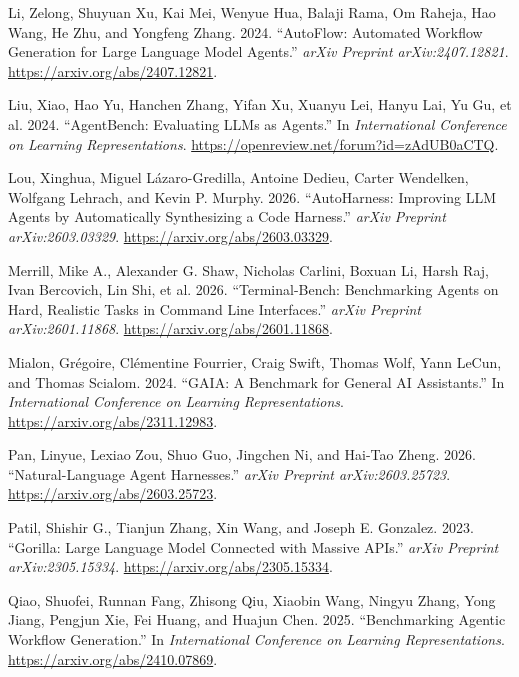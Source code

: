\documentclass[
  10pt,
]{article}
\newlength{\cslhangindent}
\newenvironment{CSLReferences}[2] %
 {\begin{list}{}{%
  \setlength{\itemindent}{0pt}
  \setlength{\leftmargin}{0pt}
  \setlength{\parsep}{0pt}
  \ifodd #1
   \setlength{\leftmargin}{\cslhangindent}
   \setlength{\itemindent}{-1\cslhangindent}
  \fi
  \setlength{\itemsep}{#2\baselineskip}}}
 {\end{list}}
\begin{document}
\begin{CSLReferences}{1}{0}
Li, Zelong, Shuyuan Xu, Kai Mei, Wenyue Hua, Balaji Rama, Om Raheja, Hao
Wang, He Zhu, and Yongfeng Zhang. 2024. {``AutoFlow: Automated Workflow
Generation for Large Language Model Agents.''} \emph{arXiv Preprint
arXiv:2407.12821}. \url{https://arxiv.org/abs/2407.12821}.

Liu, Xiao, Hao Yu, Hanchen Zhang, Yifan Xu, Xuanyu Lei, Hanyu Lai, Yu
Gu, et al. 2024. {``AgentBench: Evaluating LLMs as Agents.''} In
\emph{International Conference on Learning Representations}.
\url{https://openreview.net/forum?id=zAdUB0aCTQ}.

Lou, Xinghua, Miguel Lázaro-Gredilla, Antoine Dedieu, Carter Wendelken,
Wolfgang Lehrach, and Kevin P. Murphy. 2026. {``AutoHarness: Improving
LLM Agents by Automatically Synthesizing a Code Harness.''} \emph{arXiv
Preprint arXiv:2603.03329}. \url{https://arxiv.org/abs/2603.03329}.

Merrill, Mike A., Alexander G. Shaw, Nicholas Carlini, Boxuan Li, Harsh
Raj, Ivan Bercovich, Lin Shi, et al. 2026. {``Terminal-Bench:
Benchmarking Agents on Hard, Realistic Tasks in Command Line
Interfaces.''} \emph{arXiv Preprint arXiv:2601.11868}.
\url{https://arxiv.org/abs/2601.11868}.

Mialon, Grégoire, Clémentine Fourrier, Craig Swift, Thomas Wolf, Yann
LeCun, and Thomas Scialom. 2024. {``GAIA: A Benchmark for General AI
Assistants.''} In \emph{International Conference on Learning
Representations}. \url{https://arxiv.org/abs/2311.12983}.

Pan, Linyue, Lexiao Zou, Shuo Guo, Jingchen Ni, and Hai-Tao Zheng. 2026.
{``Natural-Language Agent Harnesses.''} \emph{arXiv Preprint
arXiv:2603.25723}. \url{https://arxiv.org/abs/2603.25723}.

Patil, Shishir G., Tianjun Zhang, Xin Wang, and Joseph E. Gonzalez.
2023. {``Gorilla: Large Language Model Connected with Massive APIs.''}
\emph{arXiv Preprint arXiv:2305.15334}.
\url{https://arxiv.org/abs/2305.15334}.

Qiao, Shuofei, Runnan Fang, Zhisong Qiu, Xiaobin Wang, Ningyu Zhang,
Yong Jiang, Pengjun Xie, Fei Huang, and Huajun Chen. 2025.
{``Benchmarking Agentic Workflow Generation.''} In \emph{International
Conference on Learning Representations}.
\url{https://arxiv.org/abs/2410.07869}.


\end{CSLReferences}
\end{document}
